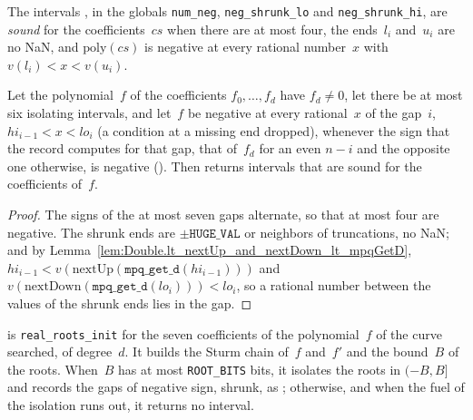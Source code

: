 \begin{definition}\label{def:NegativeIntervals.Sound}
  \leanok
  The intervals , in the globals \texttt{num\_neg},
  \texttt{neg\_shrunk\_lo} and \texttt{neg\_shrunk\_hi}, are \emph{sound} for the coefficients~$cs$
  when there are at most four, the ends~$l_i$ and~$u_i$ are no NaN, and $\mathrm{poly}(cs)$ is
  negative at every rational number~$x$ with $v(l_i) < x < v(u_i)$.
\end{definition}

\begin{lemma}\label{lem:realRootsRecord_spec}
  \leanok
  Let the polynomial~$f$ of the coefficients $f_0, \dots, f_d$ have $f_d \ne 0$, let there be at
  most six isolating intervals, and let~$f$ be negative at every rational~$x$ of the gap~$i$,
  $hi_{i-1} < x < lo_i$ (a condition at a missing end dropped), whenever the sign that the record
  computes for that gap, that of~$f_d$ for an even $n - i$ and the opposite one otherwise, is
  negative (). Then  returns intervals that
  are sound for the coefficients of~$f$.
\end{lemma}

\begin{proof}
  \leanok
  The signs of the at most seven gaps alternate, so that at most four are negative. The shrunk ends
  are $\pm\texttt{HUGE\_VAL}$ or neighbors of truncations, no NaN; and by
  Lemma~\ref{lem:Double.lt_nextUp_and_nextDown_lt_mpqGetD},
  $hi_{i-1} < v(\mathrm{nextUp}(\texttt{mpq\_get\_d}(hi_{i-1})))$ and
  $v(\mathrm{nextDown}(\texttt{mpq\_get\_d}(lo_i))) < lo_i$, so a rational number between the values
  of the shrunk ends lies in the gap.
\end{proof}

\begin{definition}\label{def:realRootsInit}
  \leanok
   is \texttt{real\_roots\_init} for the seven coefficients of the
  polynomial~$f$ of the curve searched, of degree~$d$. It builds the Sturm chain of~$f$ and~$f'$
  and the bound~$B$ of the roots. When~$B$ has at most \texttt{ROOT\_BITS} bits, it isolates the
  roots in $(-B, B]$ and records the gaps of negative sign, shrunk, as
  ; otherwise, and when the fuel of the isolation runs out, it
  returns no interval.
\end{definition}

